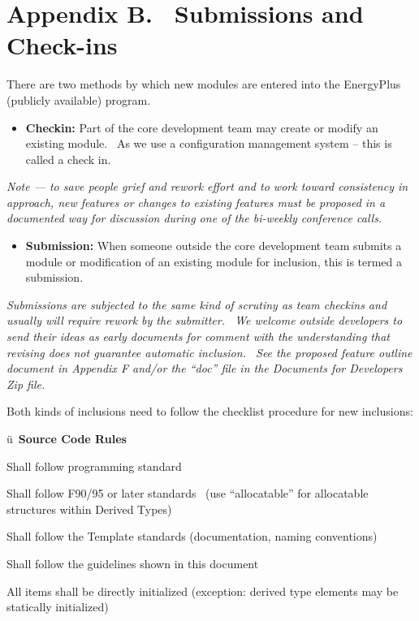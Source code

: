 \chapter{Appendix B.~ Submissions and Check-ins}\label{appendix-b.-submissions-and-check-ins}

There are two methods by which new modules are entered into the EnergyPlus (publicly available) program.

\begin{itemize}
\tightlist
\item
  \textbf{Checkin:} Part of the core development team may create or modify an existing module.~ As we use a configuration management system -- this is called a check in.
\end{itemize}

\emph{Note --- to save people grief and rework effort and to work toward consistency in approach, new features or changes to existing features must be proposed in a documented way for discussion during one of the bi-weekly conference calls.}

\begin{itemize}
\tightlist
\item
  \textbf{Submission:} When someone outside the core development team submits a module or modification of an existing module for inclusion, this is termed a submission.
\end{itemize}

\emph{Submissions are subjected to the same kind of scrutiny as team checkins and usually will require rework by the submitter.~ We welcome outside developers to send their ideas as early documents for comment with the understanding that revising does not guarantee automatic inclusion.~ See the proposed feature outline document in Appendix F and/or the ``doc'' file in the Documents for Developers Zip file.}

Both kinds of inclusions need to follow the checklist procedure for new inclusions:

ü~\textbf{Source Code Rules}

Shall follow programming standard

Shall follow F90/95 or later standards~ (use ``allocatable'' for allocatable structures within Derived Types)

Shall follow the Template standards (documentation, naming conventions)

Shall follow the guidelines shown in this document

All items shall be directly initialized (exception: derived type elements may be statically initialized)

